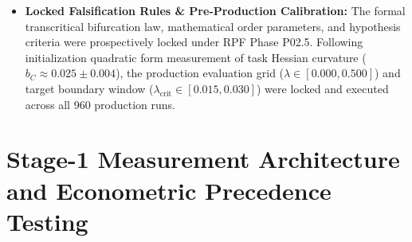 \documentclass{article}
\theoremstyle{plain}
\theoremstyle{definition}
\begin{document}
\begin{itemize}[leftmargin=*,noitemsep]
\begin{enumerate}[label=(\alph*),noitemsep]
        \item \texttt{hessian\_spectral\_summary.csv} (SHA-256: \texttt{be6a82022e091c4b01ca8fd9cf6840732c26604cd247f9d880e38a978c8c4864}): Extremal eigenvalues $\lambda_{\text{max}}(H_t)$, trace estimates, and spectral densities across 48 representative Lanczos evaluation conditions.
        \item \texttt{pairwise\_welch\_tost.csv} (SHA-256: \texttt{4900762428918c0776e05798321f3172637d9e08fe54e17c31e6359a95731e40}): Full pairwise Welch $t$-tests and TOST equivalence statistics across all 10 supercritical $\lambda$ pairs with Bonferroni/Holm adjustments.
        \item \texttt{granger\_causality\_results.csv} (SHA-256: \texttt{e86344cb1f646b153bbe13ac9cea6876d653d6e2966196b5687fcc7a547ad4f6}): Bivariate panel VAR(2) Granger causality $F$-tests, lag selection criteria (AIC/BIC/HQIC), ADF stationarity statistics, and wild cluster bootstrap $p$-values.
        \item \texttt{inflection\_breakpoints.csv} (SHA-256: \texttt{fe1ef4f502bfe2cc0ea39451a6c58cc1e0e2e75738cb6647bba9eb21bdd1100d}): Fitted logistic change-point parameters ($\hat{\lambda}_{\text{crit}}$, steepness $k$, and $R^2$) across all benchmark suites and neural architectures.
        \item \texttt{cka\_trajectories.csv} (SHA-256: \texttt{393b2c125105fa17aaa92aefb77ec2444adc92f3bb76cd5ba5bbf81305aadb6f}): Step-by-step layerwise linear CKA representation trajectories across seeds and conditions.
        \item \texttt{theoretical\_separatrix.csv} (SHA-256: \texttt{e4a9a91b2dce5963823ce29fe5155cbafd4f3e0f004d802a6884ab545fd7f9b8}): Analytical vector field solutions and Lyapunov function evaluations.
    \end{enumerate}
\item \textbf{Locked Falsification Rules \& Pre-Production Calibration:} The formal transcritical bifurcation law, mathematical order parameters, and hypothesis criteria were prospectively locked under RPF Phase P02.5. Following initialization quadratic form measurement of task Hessian curvature ($b_C \approx 0.025 \pm 0.004$), the production evaluation grid ($\lambda \in [0.000, 0.500]$) and target boundary window ($\lambda_{\text{crit}} \in [0.015, 0.030]$) were locked and executed across all 960 production runs.
\end{itemize}
\section{Stage-1 Measurement Architecture and Econometric Precedence Testing}
\label{sec:appendix_stage1_proxy}
\end{document}
